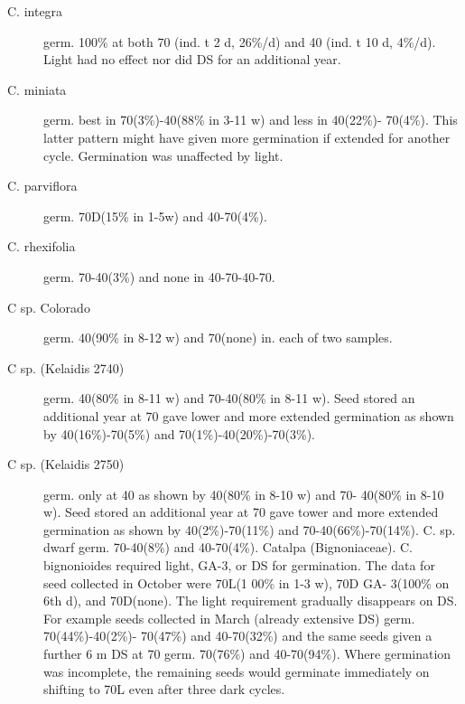 \begin{description}
\item[C. integra] germ. 100\% at both 70 (ind. t 2 d, 26\%/d) and 40 (ind. t 10 d, 4\%/d).
Light had no effect nor did DS for an additional year.
\item[C. miniata] germ. best in 70(3\%)-40(88\% in 3-11 w) and less in 40(22\%)-
70(4\%). This latter pattern might have given more germination if extended for another
cycle. Germination was unaffected by light.
\item[C. parviflora] germ. 70D(15\% in 1-5w) and 40-70(4\%).
\item[C. rhexifolia] germ. 70-40(3\%) and none in 40-70-40-70.
\item[C sp. Colorado] germ. 40(90\% in 8-12 w) and 70(none) in. each of two samples.
\item[C sp. (Kelaidis 2740)] germ. 40(80\% in 8-11 w) and 70-40(80\% in 8-11 w).
Seed stored an additional year at 70 gave lower and more extended germination as
shown by 40(16\%)-70(5\%) and 70(1\%)-40(20\%)-70(3\%).
\item[C sp. (Kelaidis 2750)] germ. only at 40 as shown by 40(80\% in 8-10 w) and 70-
40(80\% in 8-10 w). Seed stored an additional year at 70 gave tower and more
extended germination as shown by 40(2\%)-70(11\%) and 70-40(66\%)-70(14\%).
C. sp. dwarf germ. 70-40(8\%) and 40-70(4\%).
Catalpa (Bignoniaceae). C. bignonioides required light, GA-3, or DS for
germination. The data for seed collected in October were 70L(1 00\% in 1-3 w), 70D GA-
3(100\% on 6th d), and 70D(none). The light requirement gradually disappears on DS.
For example seeds collected in March (already extensive DS) germ. 70(44\%)-40(2\%)-
70(47\%) and 40-70(32\%) and the same seeds given a further 6 m DS at 70 germ.
70(76\%) and 40-70(94\%). Where germination was incomplete, the remaining seeds
would germinate immediately on shifting to 70L even after three dark cycles.


\end{description}
